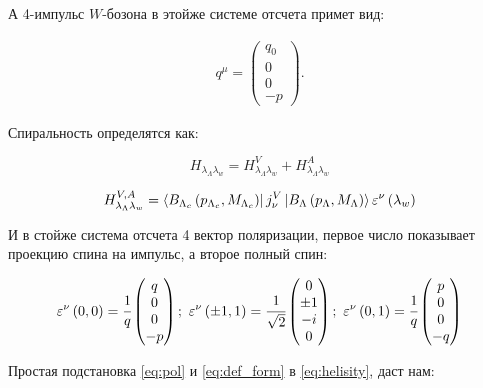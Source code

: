 А 4-импульс $W$-бозона в этойже системе отсчета примет вид:

\begin{gather}
    q^\mu = 
    \begin{pmatrix}
        q_0 \\ 0 \\ 0 \\ -p
    \end{pmatrix} .
\end{gather}

Спиральность определятся как:

\begin{equation}
    H_{\lambda_\Lambda \lambda_w} = H^V_{\lambda_\Lambda \lambda_w} 
    + H^A_{\lambda_\Lambda \lambda_w} 
\end{equation}

\begin{equation}
    H^{V,A}_{\lambda_\Lambda \lambda_w} = 
    \bra{B_{\Lambda_c} \left( p_{\Lambda_c}, M_{\Lambda_c} \right)}
    j_\nu^V
    \ket{B_{\Lambda} \left( p_{\Lambda}, M_{\Lambda} \right)} 
    \varepsilon^\nu \left( \lambda_w \right)
    \label{eq:helisity}
\end{equation}

И в стойже система отсчета 4 вектор поляризации, первое число показывает 
проекцию спина на импульс, а второе полный спин:

\begin{gather}
    \varepsilon^\nu\left( 0, 0 \right) = \cfrac{1}{q} 
    \begin{pmatrix}
        q \\ 0 \\ 0 \\ -p
    \end{pmatrix}
    ;\
    \varepsilon^\nu\left( \pm 1, 1 \right) = \cfrac{1}{\sqrt{2}} 
    \begin{pmatrix}
        0 \\ \pm 1 \\ -i \\ 0
    \end{pmatrix}
    ;\
    \varepsilon^\nu\left( 0, 1 \right) = \cfrac{1}{q} 
    \begin{pmatrix}
        p \\ 0 \\ 0 \\ -q
    \end{pmatrix}
    \label{eq:pol}
\end{gather}

Простая подстановка \ref{eq:pol} и \ref{eq:def_form} в \ref{eq:helisity}, даст нам:





